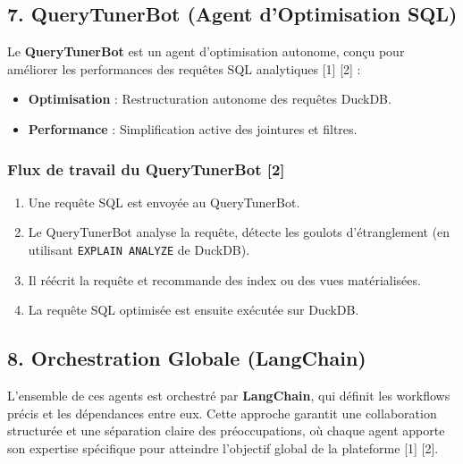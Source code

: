 \documentclass[11pt,a4paper]{article}
\begin{document}
\subsection{7. QueryTunerBot (Agent d'Optimisation SQL)}

Le \textbf{QueryTunerBot} est un agent d'optimisation autonome, conçu pour améliorer les performances des requêtes SQL analytiques [1] [2] :

\begin{itemize}[label=\color{valorantRed}\faDatabase, itemsep=6pt]
    \item \textbf{Optimisation} : Restructuration autonome des requêtes DuckDB.
    \item \textbf{Performance} : Simplification active des jointures et filtres.
\end{itemize}

\subsubsection*{Flux de travail du QueryTunerBot [2]}
\begin{enumerate}
    \item Une requête SQL est envoyée au QueryTunerBot.
    \item Le QueryTunerBot analyse la requête, détecte les goulots d'étranglement (en utilisant \texttt{EXPLAIN ANALYZE} de DuckDB).
    \item Il réécrit la requête et recommande des index ou des vues matérialisées.
    \item La requête SQL optimisée est ensuite exécutée sur DuckDB.
\end{enumerate}

\subsection{8. Orchestration Globale (LangChain)}

L'ensemble de ces agents est orchestré par \textbf{LangChain}, qui définit les workflows précis et les dépendances entre eux. Cette approche garantit une collaboration structurée et une séparation claire des préoccupations, où chaque agent apporte son expertise spécifique pour atteindre l'objectif global de la plateforme [1] [2].
\end{document}
